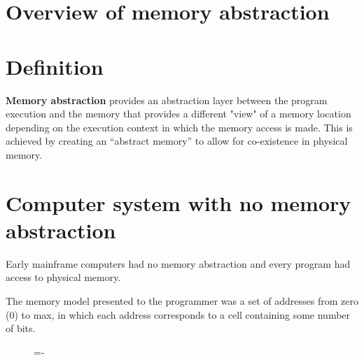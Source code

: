 \documentclass[a4paper]{systems-software}
\begin{document}
\section{Overview of memory abstraction}

\section*{Definition}

\textbf{Memory abstraction} provides an abstraction layer between the program execution and the memory that provides a different "view" of a memory location depending on the execution context in which the memory access is made. This is achieved by creating an “abstract memory” to allow for co-existence in physical memory.


\section*{Computer system with no memory abstraction}

Early mainframe computers had no memory abstraction and every program had access to physical memory.

The memory model presented to the programmer was a set of addresses from zero (0) to max, in which each address corresponds to a cell containing some number of bits.

\begin{figure}[H]
  \lineskip=-\fboxrule
\end{figure}
\end{document}
